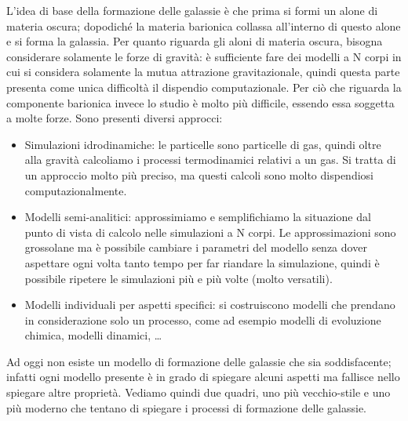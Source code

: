 L'idea di base della formazione delle galassie è che prima si formi un alone di materia oscura; dopodiché la materia barionica collassa all'interno di questo alone e si forma la galassia. Per quanto riguarda gli aloni di materia oscura, bisogna considerare solamente le forze di gravità: è sufficiente fare dei modelli a N corpi in cui si considera solamente la mutua attrazione gravitazionale, quindi questa parte presenta come unica difficoltà il dispendio computazionale. Per ciò che riguarda la componente barionica invece lo studio è molto più difficile, essendo essa soggetta a molte forze. Sono presenti diversi approcci:
\begin{itemize}
    \item Simulazioni idrodinamiche: le particelle sono particelle di gas, quindi oltre alla gravità calcoliamo i processi termodinamici relativi a un gas. Si tratta di un approccio molto più preciso, ma questi calcoli sono molto dispendiosi computazionalmente.
    \item Modelli semi-analitici: approssimiamo e semplifichiamo la situazione dal punto di vista di calcolo nelle simulazioni a N corpi. Le approssimazioni sono grossolane ma è possibile cambiare i parametri del modello senza dover aspettare ogni volta tanto tempo per far riandare la simulazione, quindi è possibile ripetere le simulazioni più e più volte (molto versatili).
    \item Modelli individuali per aspetti specifici: si costruiscono modelli che prendano in considerazione solo un processo, come ad esempio modelli di evoluzione chimica, modelli dinamici, \dots 
\end{itemize}

Ad oggi non esiste un modello di formazione delle galassie che sia soddisfacente; infatti ogni modello presente è in grado di spiegare alcuni aspetti ma fallisce nello spiegare altre proprietà. Vediamo quindi due quadri, uno più vecchio-stile e uno più moderno che tentano di spiegare i processi di formazione delle galassie.

